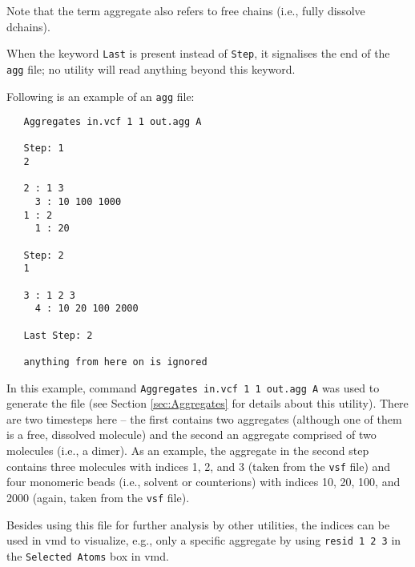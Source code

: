 Note that the term aggregate also refers to free chains (i.e., fully
dissolve dchains).

When the keyword \texttt{Last} is present instead of \texttt{Step}, it
signalises the end of the \texttt{agg} file; no utility will read anything
beyond this keyword.

Following is an example of an \texttt{agg} file:

\begin{verbatim}
   Aggregates in.vcf 1 1 out.agg A

   Step: 1
   2

   2 : 1 3
     3 : 10 100 1000
   1 : 2
     1 : 20

   Step: 2
   1

   3 : 1 2 3
     4 : 10 20 100 2000

   Last Step: 2

   anything from here on is ignored
\end{verbatim}

In this example, command \texttt{Aggregates in.vcf 1 1 out.agg A} was used
to generate the file (see Section \ref{sec:Aggregates} for details about
this utility). There are two timesteps here -- the first contains two
aggregates (although one of them is a free, dissolved molecule) and the
second an aggregate comprised of two molecules (i.e., a dimer). As an
example, the aggregate in the second step contains three molecules with
indices 1, 2, and 3 (taken from the \texttt{vsf} file) and four monomeric
beads (i.e., solvent or counterions) with indices 10, 20, 100, and 2000
(again, taken from the \texttt{vsf} file).

Besides using this file for further analysis by other utilities, the
indices can be used in vmd to visualize, e.g., only a specific aggregate by
using \texttt{resid 1 2 3} in the \texttt{Selected Atoms} box in vmd.
